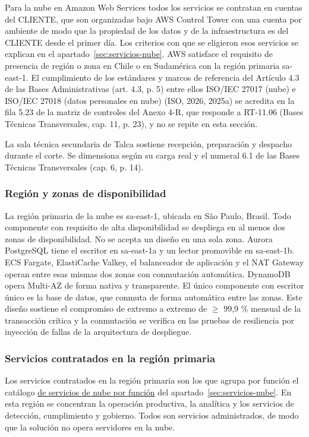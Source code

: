 Para la nube en Amazon Web Services todos los servicios se contratan en cuentas del CLIENTE, que son organizadas bajo AWS Control Tower con una cuenta por ambiente de modo que la propiedad de los datos y de la infraestructura es del CLIENTE desde el primer día. Los criterios con que se eligieron esos servicios se explican en el apartado~\ref{sec:servicios-nube}. AWS satisface el requisito de presencia de región o zona en Chile o en Sudamérica con la región primaria sa-east-1. El cumplimiento de los estándares y marcos de referencia del Artículo 4.3 de las Bases Administrativas (art. 4.3, p. 5) entre ellos ISO/IEC 27017 (nube) e ISO/IEC 27018 (datos personales en nube) (ISO, 2026, 2025a) se acredita en la fila 5.23 de la matriz de controles del Anexo 4-R, que responde a RT-11.06 (Bases Técnicas Transversales, cap. 11, p. 23), y no se repite en esta sección.

La sala técnica secundaria de Talca sostiene recepción, preparación y despacho durante el corte. Se dimensiona según su carga real y el numeral 6.1 de las Bases Técnicas Transversales (cap. 6, p. 14).

\subsubsection{Región y zonas de disponibilidad}

La región primaria de la nube es sa-east-1, ubicada en São Paulo, Brasil. Todo componente con requisito de alta disponibilidad se despliega en al menos dos zonas de disponibilidad. No se acepta un diseño en una sola zona. Aurora PostgreSQL tiene el escritor en sa-east-1a y un lector promovible en sa-east-1b. ECS Fargate, ElastiCache Valkey, el balanceador de aplicación y el NAT Gateway operan entre esas mismas dos zonas con conmutación automática. DynamoDB opera Multi-AZ de forma nativa y transparente. El único componente con escritor único es la base de datos, que conmuta de forma automática entre las zonas. Este diseño sostiene el compromiso de extremo a extremo de $\geq$ 99,9 \% mensual de la transacción crítica y la conmutación se verifica en las pruebas de resiliencia por inyección de fallas de la arquitectura de despliegue.

\subsubsection{Servicios contratados en la región primaria}

Los servicios contratados en la región primaria son los que agrupa por función el catálogo \hyperref[tab:servicios-nube]{de servicios de nube por función} del apartado~\ref{sec:servicios-nube}. En esta región se concentran la operación productiva, la analítica y los servicios de detección, cumplimiento y gobierno. Todos son servicios administrados, de modo que la solución no opera servidores en la nube.

